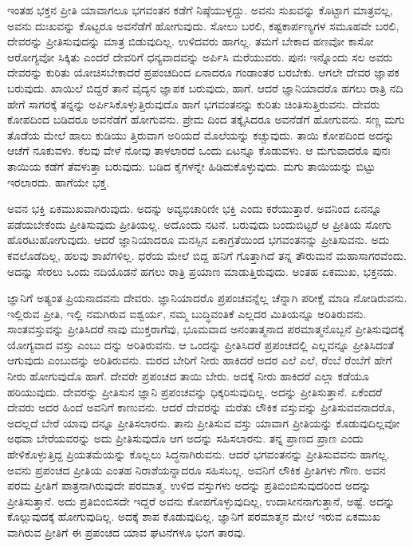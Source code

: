 ಇಂತಹ ಭಕ್ತನ ಪ್ರೀತಿ ಯಾವಾಗಲೂ ಭಗವಂತನ ಕಡೆಗೆ ನಿಷ್ಠೆಯುಳ್ಳದ್ದು. ಅವನು ಸುಖವನ್ನು ಕೊಟ್ಟಾಗ ಮಾತ್ರವಲ್ಲ, ಅವನು ದುಃಖವನ್ನು ಕೊಟ್ಟರೂ ಅವನೆಡೆಗೆ ಹೋಗುವುದು. ಸೋಲು ಬರಲಿ, ಕಷ್ಟಕಾರ್ಪಣ್ಯಗಳ ಸಮೂಹವೇ ಬರಲಿ, ದೇವರನ್ನು ಪ್ರೀತಿಸುವುದನ್ನು ಮಾತ್ರ ಬಿಡುವುದಿಲ್ಲ. ಉಳಿದವರು ಹಾಗಲ್ಲ. ತಮಗೆ ಬೇಕಾದ ಹಣವೋ ಕಾಸೋ ಆರೋಗ್ಯವೋ ಸಿಕ್ಕಿತು ಎಂದರೆ ದೇವರಿಗೆ ಧನ್ಯವಾದವನ್ನು ಅರ್ಪಿಸಿ ಮರೆಯುವರು. ಪುನಃ ಇನ್ನೊಂದು ಸಲ ಅವರು ದೇವರನ್ನು ಕುರಿತು ಯೋಚಿಸಬೇಕಾದರೆ ಪ್ರಪಂಚದಿಂದ ಏನಾದರೂ ಗಂಡಾಂತರ ಬರಬೇಕು. ಆಗಲೇ ದೇವರ ಜ್ಞಾಪಕ ಬರುವುದು. ಖಾಯಿಲೆ ಬಿದ್ದರೆ ತಾನೆ ವೈದ್ಯನ ಜ್ಞಾಪಕ ಬರುವುದು, ಹಾಗೆ. ಆದರೆ ಜ್ಞಾನಿಯಾದರೊ ಹಗಲು ರಾತ್ರಿ ನದಿ ಹೇಗೆ ಸಾಗರಕ್ಕೆ ತನ್ನನ್ನು ಅರ್ಪಿಸಿಕೊಳ್ಳುತ್ತಿರುವುದೊ ಹಾಗೆ ಭಗವಂತನನ್ನು ಕುರಿತು ಚಿಂತಿಸುತ್ತಿರುವನು. ದೇವರು ಕೋಪದಿಂದ ಬಡಿದರೂ ಅವನೆಡೆಗೆ ಹೋಗುವನು. ಪ್ರೇಮ ದಿಂದ ತಕ್ಕೈಸಿದರೂ ಅವನೆಡೆಗೆ ಹೋಗುವನು. ಸಣ್ಣ ಮಗು ತೊಡೆಯ ಮೇಲೆ ಹಾಲು ಕುಡಿಯು ತ್ತಿರುವಾಗ ಅರಿಯದೆ ಮೊಲೆಯನ್ನು ಕಚ್ಚುವುದು. ತಾಯಿ ಕೋಪದಿಂದ ಅದನ್ನು ಆಚೆಗೆ ನೂಕುವಳು. ಕೆಲವು ವೇಳೆ ನೋವು ತಾಳಲಾರದೆ ಒಂದು ಏಟನ್ನೂ ಕೊಡುವಳು. ಆ ಮಗುವಾದರೊ ಪುನಃ ತಾಯಿಯ ಕಡೆಗೆ ತೆವಳುತ್ತಾ ಬರುವುದು. ಬಡಿದ ಕೈಗಳನ್ನೇ ಹಿಡಿದುಕೊಳ್ಳುವುದು. ಮಗು ತಾಯಿಯನ್ನು ಬಿಟ್ಟು ಇರಲಾರದು. ಹಾಗೆಯೇ ಭಕ್ತ.

ಅವನ ಭಕ್ತಿ ಏಕಮುಖವಾಗಿರುವುದು. ಅದನ್ನು ಅವ್ಯಭಿಚಾರಿಣೀ ಭಕ್ತಿ ಎಂದು ಕರೆಯುತ್ತಾರೆ. ಅವನಿಂದ ಏನನ್ನೂ ಪಡೆಯಬೇಕೆಂದು ಪ್ರೀತಿಸುವುದು ಪ್ರೀತಿಯಲ್ಲ. ಅದೊಂದು ನಟನೆ. ಬರುವುದು ಬಂದುಬಿಟ್ಟರೆ ಆ ಪ್ರೀತಿಯ ಸೋಗು ಹೊರಟುಹೋಗುವುದು. ಆದರೆ ಜ್ಞಾನಿಯಾದರೂ ಮನಸ್ಸಿನ ಏಕಾಗ್ರತೆಯಿಂದ ಭಗವಂತನನ್ನು ಪ್ರೀತಿಸುವನು. ಅದು ಕವಲೊಡೆದಿಲ್ಲ, ಹಲವು ಶಾಖೆಗಳಿಲ್ಲ. ಧರೆಯ ಮೇಲೆ ಬಿದ್ದ ಹನಿಗೆ ಗೊತ್ತಾಗಿದೆ ತನ್ನ ತೌರುಮನೆ ಮಹಾಸಾಗರವೆಂದು. ಅದನ್ನು ಸೇರಲು ಒಂದು ನದಿಯೊಡನೆ ಹಗಲು ರಾತ್ರಿ ಪ್ರಯಾಣ ಮಾಡುತ್ತಿರುವುದು. ಅಂತಹ ಏಕಮುಖ, ಭಕ್ತನದು.

ಜ್ಞಾನಿಗೆ ಅತ್ಯಂತ ಪ್ರಿಯನಾದವನು ದೇವರು. ಜ್ಞಾನಿಯಾದರೊ ಪ್ರಪಂಚವನ್ನೆಲ್ಲ ಚೆನ್ನಾಗಿ ಪರೀಕ್ಷೆ ಮಾಡಿ ನೋಡಿರುವನು. ಇಲ್ಲಿರುವ ಪ್ರೀತಿ, ಇಲ್ಲಿ ನಮಗಿರುವ ಐಶ್ವರ್ಯ, ನಮ್ಮ ಬುದ್ಧಿವಂತಿಕೆ ಎಲ್ಲದರ ಮಿತಿಯನ್ನೂ ಅರಿತಿರುವನು. ಸಾಂತವಸ್ತುವನ್ನು ಪ್ರೀತಿಸಿದರೆ ನಾವು ಮುಕ್ತರಾಗೆವು, ಭೂಮವಾದ ಅನಂತಾತ್ಮನಾದ ಪರಮಾತ್ಮನೊಬ್ಬನೆ ಪ್ರೀತಿಸುವುದಕ್ಕೆ ಯೋಗ್ಯವಾದ ವಸ್ತು ಎಂಬು ದನ್ನು ಅರಿತಿರುವನು. ಆ ಒಂದನ್ನು ಪ್ರೀತಿಸಿದರೆ ಪ್ರಪಂಚದಲ್ಲಿ ಎಲ್ಲವನ್ನೂ ಪ್ರೀತಿಸಿದಂತೆ ಆಗುವುದು ಎಂಬುದನ್ನು ಅರಿತಿರುವನು. ಮರದ ಬೇರಿಗೆ ನೀರು ಹಾಕಿದರೆ ಅದರ ಎಲೆ ಎಲೆ, ರೆಂಬೆ ರೆಂಬೆಗೆ ಹೇಗೆ ನೀರು ಹೋಗುವುದೊ ಹಾಗೆ. ದೇವರೇ ಪ್ರಪಂಚದ ತಾಯಿ ಬೇರು. ಅದಕ್ಕೆ ನೀರು ಹಾಕಿದರೆ ಎಲ್ಲಾ ಕಡೆಯೂ ಹರಿಯುವುದು. ದೇವರನ್ನು ಪ್ರೀತಿಸುನ ಜ್ಞಾನಿ ಪ್ರಪಂಚವನ್ನು ಧಿಕ್ಕರಿಸುವುದಿಲ್ಲ. ಅದನ್ನು ಪ್ರೀತಿಸುತ್ತಾನೆ. ಏಕೆಂದರೆ ದೇವರು ಅದರ ಹಿಂದೆ ಅವನಿಗೆ ಕಾಣುವನು. ಆದರೆ ದೇವರನ್ನು ಮರೆತು ಲೌಕಿಕ ವಸ್ತುವನ್ನು ಪ್ರೀತಿಸುವವನಾದರೊ, ಅದಲ್ಲದೆ ಬೇರೆ ಯಾವು ದನ್ನೂ ಪ್ರೀತಿಸಲಾರನು. ತಾನು ಪ್ರೀತಿಸುವ ವಸ್ತು ಯಾವಾಗ ಪ್ರೀತಿಯನ್ನು ಕೊಡುವುದಿಲ್ಲವೋ ಅಥವಾ ಬೇರೆಯವರನ್ನು ಅದು ಪ್ರೀತಿಸುವುದೊ ಆಗ ಅದನ್ನು ಸಹಿಸಲಾರನು. ತನ್ನ ಪ್ರಾಣದ ಪ್ರಾಣ ಎಂದು ಹೇಳಿಕೊಳ್ಳುತ್ತಿದ್ದ ಪ್ರಿಯತಮೆಯನ್ನು ಕೊಲ್ಲಲು ಸಿದ್ಧನಾಗಿರುವನು. ಆದರೆ ಭಗವಂತನನ್ನು ಪ್ರೀತಿಸುವವನು ಹಾಗಲ್ಲ. ಅವನು ಪ್ರಪಂಚದ ಪ್ರೀತಿಯ ಎಂತಹ ನಿರಾಶೆಯನ್ನಾದರೂ ಸಹಿಸಬಲ್ಲ. ಅವನಿಗೆ ಲೌಕಿಕ ಪ್ರೀತಿಗಳು ಗೌಣ. ಅವನ ಪರಮ ಪ್ರೀತಿಗೆ ಪಾತ್ರನಾಗಿರುವುದೇ ಪರಮಾತ್ಮ. ಉಳಿದ ವಸ್ತುಗಳು ಅದನ್ನು ಪ್ರತಿಬಿಂಬಿಸುವುದರಿಂದ ಅದನ್ನು ಪ್ರೀತಿಸುತ್ತಾನೆ. ಅದು ಪ್ರತಿಬಿಂಬಿಸದೇ ಇದ್ದರೆ ಅವನು ಕೋಪಗೊಳ್ಳುವುದಿಲ್ಲ, ಉದಾಸೀನನಾಗುತ್ತಾನೆ, ಅಷ್ಟೆ. ಅದನ್ನು ಕೊಲ್ಲುವುದಕ್ಕೆ ಹೋಗುವುದಿಲ್ಲ. ಅದಕ್ಕೆ ಶಾಪ ಕೊಡುವುದಿಲ್ಲ. ಜ್ಞಾನಿಗೆ ಪರಮಾತ್ಮನ ಮೇಲೆ ಇರುವ ಏಕಮುಖ ವಾಗಿರುವ ಪ್ರೀತಿಗೆ ಈ ಪ್ರಪಂಚದ ಯಾವ ಘಟನೆಗಳೂ ಭಂಗ ತಾರವು.

